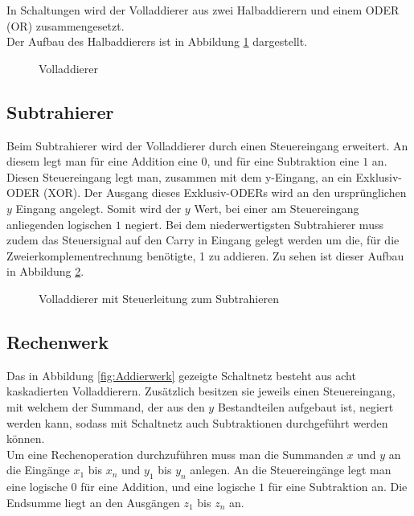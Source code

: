 \documentclass[a4paper,12pt,fleqn,oneside]{article}
\begin{document}
		\noindent
		In Schaltungen wird der Volladdierer aus zwei Halbaddierern und einem ODER (OR) zusammengesetzt.\\
		Der Aufbau des Halbaddierers ist in Abbildung \ref{fig:volladdierer} dargestellt.

		\begin{figure}[h]
			\center
			
			\caption{Volladdierer}
			\label{fig:volladdierer}
		\end{figure}

\newpage

	\subsection{Subtrahierer}
		Beim Subtrahierer wird der Volladdierer durch einen Steuereingang erweitert. An diesem legt man für eine Addition eine
		$0$, und für eine Subtraktion eine $1$ an. Diesen Steuereingang legt man, zusammen mit dem y-Eingang, an ein
		Exklusiv-ODER (XOR). Der Ausgang dieses Exklusiv-ODERs wird an den ursprünglichen $y$ Eingang angelegt. Somit wird
		der $y$ Wert, bei einer am Steuereingang anliegenden logischen $1$ negiert. Bei dem niederwertigsten Subtrahierer muss
		zudem das Steuersignal auf den Carry in Eingang gelegt werden um die, für die Zweierkomplementrechnung benötigte, 1
		zu addieren. Zu sehen ist dieser Aufbau in Abbildung \ref{fig:steuerbarer_volladdierer}.

		\begin{figure}[h]
			\center
			
			\caption{Volladdierer mit Steuerleitung zum Subtrahieren}
			\label{fig:steuerbarer_volladdierer}
		\end{figure}



\newpage

	\subsection{Rechenwerk}
		Das in Abbildung \ref{fig:Addierwerk} gezeigte Schaltnetz besteht aus acht kaskadierten Volladdierern. Zusätzlich besitzen
		sie jeweils einen Steuereingang, mit welchem der Summand, der aus den $y$ Bestandteilen aufgebaut ist, negiert werden
		kann, sodass mit Schaltnetz auch Subtraktionen durchgeführt werden können.\\
		Um eine Rechenoperation durchzuführen muss man die Summanden $x$ und $y$ an die Eingänge $x_1$ bis $x_n$ und
		$y_1$ bis $y_n$ anlegen. An die Steuereingänge legt man eine logische $0$ für eine Addition, und eine logische $1$ für
		eine Subtraktion an. Die Endsumme liegt an den Ausgängen $z_1$ bis $z_n$ an.
\end{document}
